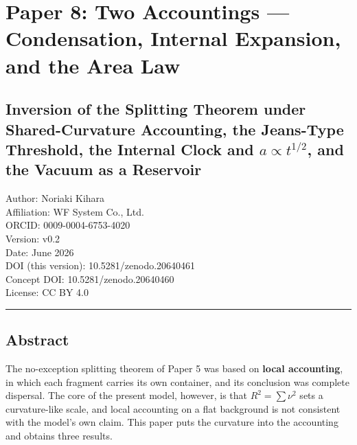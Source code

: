 \documentclass[
]{article}
\author{}
\date{}
\begin{document}
\section{Paper 8: Two Accountings --- Condensation, Internal Expansion,
and the Area
Law}\label{paper-8-two-accountings-condensation-internal-expansion-and-the-area-law}

\subsection{\texorpdfstring{Inversion of the Splitting Theorem under
Shared-Curvature Accounting, the Jeans-Type Threshold, the Internal
Clock and \(a\propto t^{1/2}\), and the Vacuum as a
Reservoir}{Inversion of the Splitting Theorem under Shared-Curvature Accounting, the Jeans-Type Threshold, the Internal Clock and a\textbackslash propto t\^{}\{1/2\}, and the Vacuum as a Reservoir}}\label{inversion-of-the-splitting-theorem-under-shared-curvature-accounting-the-jeans-type-threshold-the-internal-clock-and-apropto-t12-and-the-vacuum-as-a-reservoir}

Author: Noriaki Kihara\\
Affiliation: WF System Co., Ltd.\\
ORCID: 0009-0004-6753-4020\\
Version: v0.2\\
Date: June 2026\\
DOI (this version): 10.5281/zenodo.20640461\\
Concept DOI: 10.5281/zenodo.20640460\\
License: CC BY 4.0

\begin{center}\rule{0.5\linewidth}{0.5pt}\end{center}

\subsection{Abstract}\label{abstract}

The no-exception splitting theorem of Paper 5 was based on \textbf{local
accounting}, in which each fragment carries its own container, and its
conclusion was complete dispersal. The core of the present model,
however, is that \(R^2=\sum\nu^2\) sets a curvature-like scale, and
local accounting on a flat background is not consistent with the model's
own claim. This paper puts the curvature into the accounting and obtains
three results.
\end{document}
